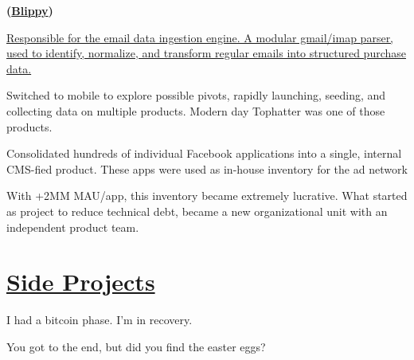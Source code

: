 \documentclass[]{plushcv}
\begin{document}
\begin{minipage}[t]{0.74\textwidth}
 \textbf{(\href{https://techcrunch.com/tag/blippy/}{Blippy})}
\begin{tightemize}
\item \href{https://techcrunch.com/2010/04/01/blippy-amazon/}{Responsible for the email data ingestion engine. A modular gmail/imap parser, used to identify, normalize, and transform regular emails into structured purchase data.}
\item Switched to mobile to explore possible pivots, rapidly launching, seeding, and collecting data on multiple products. Modern day Tophatter was one of those products.
\end{tightemize}
\sectionsep

\begin{tightemize}
\item Consolidated hundreds of individual Facebook applications into a single, internal CMS-fied  product. These apps were used as in-house inventory for the ad network  
\item With +2MM MAU/app, this inventory became extremely lucrative.  What started as project to reduce technical debt, became a new organizational unit with an independent product team.
\end{tightemize}
\sectionsep




\section{\href{https://github.com/rromanchuk}{Side Projects}}

\begin{tightemize}
\item I had a bitcoin phase. I'm in recovery. 
\end{tightemize}
\sectionsep

\begin{tightemize}
\item You got to the end, but did you find the easter eggs?  
\end{tightemize}
\sectionsep



\end{minipage}
\end{document}

